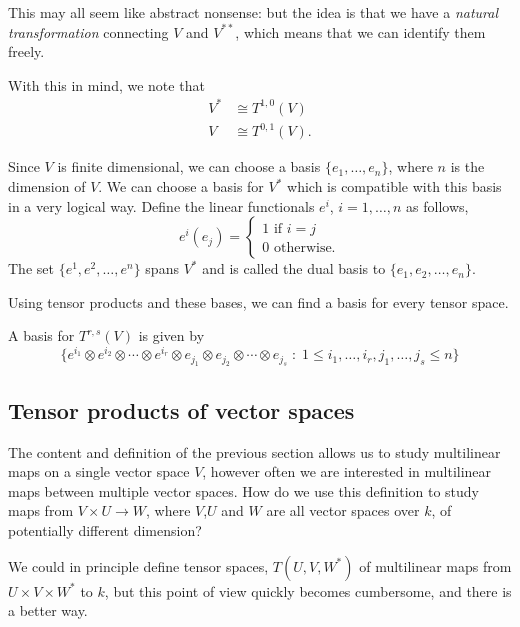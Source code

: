This may all seem like abstract nonsense: but the idea is that we have a \emph{natural transformation}
connecting $V$ and $V^{**}$, which means that we can identify them freely.

With this in mind, we note that
\begin{align*}
    V^* &\cong T^{1,0}(V)\\
    V   &\cong T^{0,1}(V).
\end{align*}

Since $V$ is finite dimensional, we can choose a basis $\{e_1,\ldots,e_n\}$,
where $n$ is the dimension of $V$. We can choose a basis for $V^*$ which is compatible
with this basis in a very logical way. Define the linear functionals $e^{i}$, $i = 1,\ldots,n$
as follows,
\begin{equation*}
    e^{i}(e_j) = \begin{cases}
        1\text{ if }i = j\\
        0\text{ otherwise.}
    \end{cases}
\end{equation*}
The set $\{e^1,e^2,\ldots,e^n\}$ spans $V^*$ and is called the dual basis to $\{e_1,e_2,\ldots,e_n\}$.

Using tensor products and these bases, we can find a basis for every tensor space.

\begin{proposition}
    A basis for $T^{r,s}(V)$ is given by
    \begin{equation*}
        \{ e^{i_1}\otimes e^{i_2}\otimes\cdots\otimes e^{i_r} \otimes e_{j_1}\otimes e_{j_2} \otimes \cdots\otimes e_{j_s}\;:\; 1\leq  i_1,\ldots,i_r,j_1,\ldots,j_s \leq n\}
    \end{equation*}
\end{proposition}

\subsection{Tensor products of vector spaces}
The content and definition of the previous section allows us to study
multilinear maps on a single vector space $V$, however
often we are interested in multilinear maps between multiple vector spaces. How 
do we use this definition to study maps from $V\times U \rightarrow W$, where $V$,$U$
and $W$ are all vector spaces over $k$, of potentially different dimension?

We could in principle define tensor spaces, $T(U,V,W^*)$ of multilinear maps
from $U\times V\times W^*$ to $k$, but this point of view quickly becomes cumbersome,
and there is a better way.

